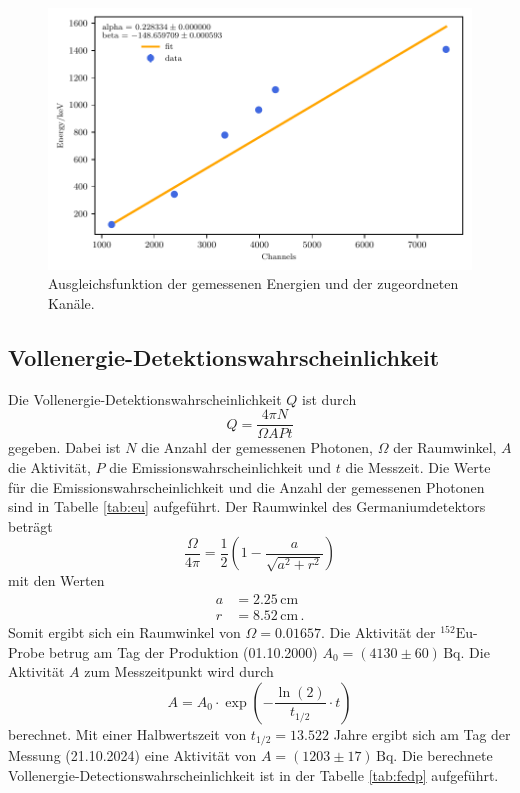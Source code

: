 \begin{figure}[H]
  \centering
  \includegraphics[width=\textwidth]{../plots/Europium-Fit.pdf}
  \caption{Ausgleichsfunktion der gemessenen Energien und der zugeordneten Kanäle.}
  \label{fig:kalibrierung}
\end{figure}

\subsection{Vollenergie-Detektionswahrscheinlichkeit}
Die Vollenergie-Detektionswahrscheinlichkeit $Q$ ist durch 
\begin{equation}
  Q = \frac{4 \pi N}{\Omega A P t}
\end{equation}
gegeben.
Dabei ist $N$ die Anzahl der gemessenen Photonen, $\Omega$ der Raumwinkel, $A$ die Aktivität, $P$ die Emissionswahrscheinlichkeit und $t$ die Messzeit.
Die Werte für die Emissionswahrscheinlichkeit und die Anzahl der gemessenen Photonen sind in Tabelle \ref{tab:eu} aufgeführt.
Der Raumwinkel des Germaniumdetektors beträgt
\begin{equation}
  \frac{\Omega}{4\pi} =\frac{1}{2}\left(1-\frac{a}{\sqrt{a^2+r^2}}\right) 
\end{equation}
mit den Werten 
\begin{align*}
  a &= 2.25 \, \si{\centi\meter} \\
  r &= 8.52 \, \si{\centi\meter} \, .
\end{align*}
Somit ergibt sich ein Raumwinkel von $\Omega = 0.01657$.
Die Aktivität der $^{152}\text{Eu}$-Probe betrug am Tag der Produktion (01.10.2000) $A_0 = (4130 \pm 60) \, \si{\becquerel}$.
Die Aktivität $A$ zum Messzeitpunkt wird durch
\begin{equation}
  A = A_0 \cdot \exp\left(-\frac{\ln(2)}{t_{1/2}} \cdot t\right)
\end{equation}
berechnet.
Mit einer Halbwertszeit von $t_{1/2} = 13.522$ Jahre ergibt sich am Tag der Messung (21.10.2024) 
eine Aktivität von $A = ( 1203 \pm 17 ) \, \si{\becquerel}$.
Die berechnete Vollenergie-Detectionswahrscheinlichkeit ist in der Tabelle \ref{tab:fedp} aufgeführt.

